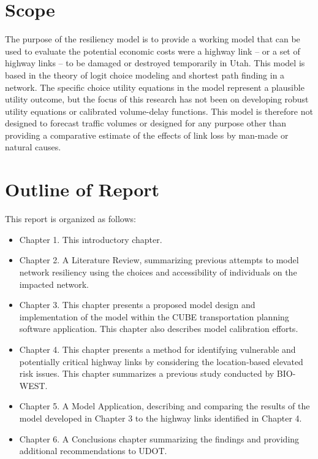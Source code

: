 \section{Scope}
The purpose of the resiliency model is to provide a working model that can be used to evaluate
the potential economic costs were a highway link – or a set of highway links – to be damaged or
destroyed temporarily in Utah. This model is based in the theory of logit choice modeling and
shortest path finding in a network. The specific choice utility equations in the model represent
a plausible utility outcome, but the focus of this research has not been on developing robust
utility equations or calibrated volume-delay functions. This model is therefore not designed to
forecast traffic volumes or designed for any purpose other than providing a comparative estimate
of the effects of link loss by man-made or natural causes. 

\section{Outline of Report}

This report is organized as follows: 

\begin{itemize}
	\item Chapter 1.	This introductory chapter.
	\item Chapter 2.	A Literature Review, summarizing previous attempts to model network resiliency using the choices and accessibility of individuals on the impacted network.
	\item Chapter 3.	This chapter presents a proposed model design and implementation of the model within the CUBE transportation planning software application. This chapter also describes model calibration efforts.
	\item Chapter 4.	This chapter presents a method for identifying vulnerable and potentially critical highway links by considering the location-based elevated risk issues. This chapter summarizes a previous study conducted by BIO-WEST. 
	\item Chapter 5.	A Model Application, describing and comparing the results of the model developed in Chapter 3 to the highway links identified in Chapter 4.
	\item Chapter 6.	A Conclusions chapter summarizing the findings and providing additional recommendations to UDOT.
\end{itemize}




